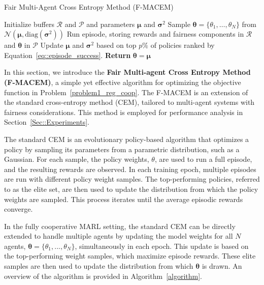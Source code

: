 \label{sus_fair}

\begin{algorithm}[ht]
    \centering
    \caption{Fair Multi-Agent Cross Entropy Method (F-MACEM)}\label{algorithm}
    \begin{algorithmic}[1]
        \REPEAT
            \STATE Initialize buffers $\mathcal{R}$ and $\mathcal{P}$ and parameters $\boldsymbol\mu$ and $\boldsymbol\sigma^2$      
                \STATE Sample $\boldsymbol\theta = \{\theta_1, \dots, \theta_N\}$ from $\mathcal{N}(\boldsymbol\mu, \text{diag}(\boldsymbol\sigma^2))$
                \STATE Run episode, storing rewards and fairness components in $\mathcal{R}$ and $\boldsymbol\theta$ in $\mathcal{P}$ 
            \ENDFOR
            \STATE Update $\boldsymbol\mu$ and $\boldsymbol\sigma^2$ based on top $p\%$ of policies ranked by Equation~\ref{eq::episode_success}.
        \STATE \textbf{Return} $\boldsymbol\theta = \boldsymbol\mu$
    \end{algorithmic}
\end{algorithm}

In this section, we introduce the \textbf{Fair Multi-agent Cross Entropy Method (F-MACEM)}, a simple yet effective algorithm for optimizing the objective function in Problem~\ref{problem1_reg_coop}. The F-MACEM is an extension of the standard cross-entropy method (CEM), tailored to multi-agent systems with fairness considerations. This method is employed for performance analysis in Section~\ref{Sec::Experiments}.

The standard CEM is an evolutionary policy-based algorithm that optimizes a policy by sampling its parameters from a parametric distribution, such as a Gaussian. For each sample, the policy weights, $\theta$, are used to run a full episode, and the resulting rewards are observed. In each training epoch, multiple episodes are run with different policy weight samples. The top-performing policies, referred to as the elite set, are then used to update the distribution from which the policy weights are sampled. This process iterates until the average episodic rewards converge.

In the fully cooperative MARL setting, the standard CEM can be directly extended to handle multiple agents by updating the model weights for all $N$ agents, $\boldsymbol\theta=\{\theta_1,...,\theta_N\}$, simultaneously in each epoch. This update is based on the top-performing weight samples, which maximize episode rewards. These elite samples are then used to update the distribution from which $\boldsymbol{\theta}$ is drawn. An overview of the algorithm is provided in Algorithm~\ref{algorithm}.